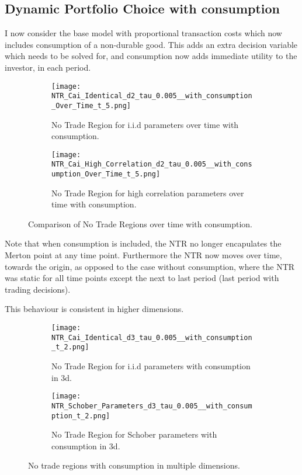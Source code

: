 \documentclass[11pt]{article}
\begin{document}
\subsection{Dynamic Portfolio Choice with consumption} \label{Subsection: Results_WithConsumption}
I now consider the base model with proportional transaction costs which now includes consumption of a non-durable good.
This adds an extra decision variable which needs to be solved for, and consumption now adds immediate utility to the investor, in each period.
\begin{figure}[!ht]
    \centering
    \begin{subfigure}[t]{0.48\textwidth}
        \centering
        \texttt{[image: NTR\_Cai\_Identical\_d2\_tau\_0.005\_\_with\_consumption\_Over\_Time\_t\_5.png]}
        \caption{No Trade Region for i.i.d parameters over time with consumption.}
        \label{fig:NTR_2d_iid_with_consumption_over_time}
    \end{subfigure}%
    \hfill
    \begin{subfigure}[t]{0.48\textwidth}
        \centering
        \texttt{[image: NTR\_Cai\_High\_Correlation\_d2\_tau\_0.005\_\_with\_consumption\_Over\_Time\_t\_5.png]}
        \caption{No Trade Region for high correlation parameters over time with consumption.}
        \label{fig:NTR_2d_high_correlation_with_consumption_over_time}
    \end{subfigure}
    \caption{Comparison of No Trade Regions over time with consumption.}
\end{figure}

Note that when consumption is included, the \ac{NTR} no longer encapulates the Merton point at any time point.
Furthermore the \ac{NTR} now moves over time, towards the origin, as opposed to the case without consumption,
where the \ac{NTR} was static for all time points except the next to last period (last period with trading decisions).

This behaviour is consistent in higher dimensions. 

\begin{figure}[!ht]
    \centering
    \begin{subfigure}[t]{0.48\textwidth}
        \centering
        \texttt{[image: NTR\_Cai\_Identical\_d3\_tau\_0.005\_\_with\_consumption\_t\_2.png]}
        \caption{No Trade Region for i.i.d parameters with consumption in 3d.}
    \end{subfigure}%
    \hfill
    \begin{subfigure}[t]{0.48\textwidth}
        \centering
        \texttt{[image: NTR\_Schober\_Parameters\_d3\_tau\_0.005\_\_with\_consumption\_t\_2.png]}
        \caption{No Trade Region for Schober parameters with consumption in 3d.}
    \end{subfigure}
    \caption{No trade regions with consumption in multiple dimensions.}
\end{figure}
\end{document}
